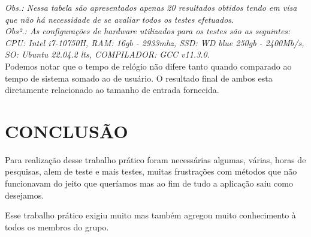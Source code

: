 \documentclass[12pt]{article}
\begin{document}
        \textit{Obs.: Nessa tabela são apresentados apenas 20 resultados obtidos tendo em visa
        que não há necessidade de se avaliar todos os testes efetuados.\\
        Obs².: As configurações de hardware utilizados para os testes são as seguintes:\\ 
        CPU: Intel i7-10750H, RAM: 16gb - 2933mhz, SSD: WD blue 250gb - 2400Mb/s, \\SO: Ubuntu 22.04.2 lts,
        COMPILADOR: GCC v11.3.0.}\\

        Podemos notar que o tempo de relógio não difere tanto quando comparado ao tempo de sistema 
        somado ao de usuário. O resultado final de ambos esta diretamente relacionado ao tamanho de entrada fornecida.
        
    \newpage
    \section{CONCLUSÃO}
        Para realização desse trabalho prático foram necessárias algumas, várias, horas de pesquisas,
        alem de teste e mais testes, muitas frustrações com métodos que não funcionavam do jeito que queríamos
        mas ao fim de tudo a aplicação saiu como desejamos.

        Esse trabalho prático exigiu muito mas também agregou muito conhecimento à todos os membros do grupo.
	\newpage
    \nocite{Cormen2012}
    \nocite{Backes2012}
	\nocite{Backes2016}
    \nocite{GNU}

\end{document}
